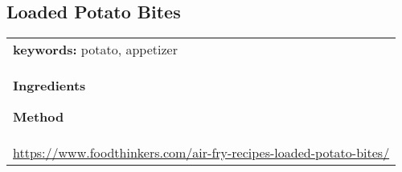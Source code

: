 \documentclass[../web-recipes.tex]{subfiles}
\begin{document}
    \renewcommand{\mytitle}{Loaded Potato Bites}
    \renewcommand{\myurl}{https://www.foodthinkers.com/air-fry-recipes-loaded-potato-bites/}

    \begin{mdframed}[nobreak]
      \section{\mytitle}
      \begin{tabular}{l}
      {\sffamily\footnotesize \textbf{keywords:}
        potato, appetizer
      } \vspace{0.5ex}\\
        \begin{minipage}[t]{0.35\textwidth}
          {\sffamily\bfseries Ingredients}\vspace{0.5ex}
          
        \end{minipage}
        \qquad
        \begin{minipage}[t]{0.55\textwidth}
          {\sffamily\bfseries Method}\vspace{0.5ex}
          
        \end{minipage} \vspace{3ex}\\
        \multicolumn{1}{c}{\small\ttfamily \url{\myurl}} \\
      \end{tabular}
    \end{mdframed}
    
\end{document}
